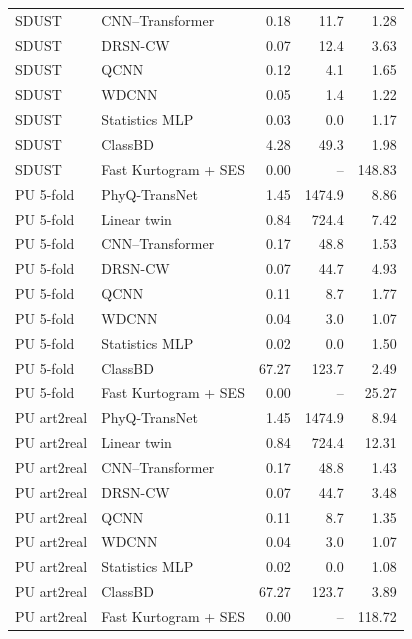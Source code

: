 \begin{tabular}{llrrr}
SDUST & CNN--Transformer & 0.18 & 11.7 & 1.28 \\
SDUST & DRSN-CW & 0.07 & 12.4 & 3.63 \\
SDUST & QCNN & 0.12 & 4.1 & 1.65 \\
SDUST & WDCNN & 0.05 & 1.4 & 1.22 \\
SDUST & Statistics MLP & 0.03 & 0.0 & 1.17 \\
SDUST & ClassBD & 4.28 & 49.3 & 1.98 \\
SDUST & Fast Kurtogram + SES & 0.00 & -- & 148.83 \\
PU 5-fold & PhyQ-TransNet & 1.45 & 1474.9 & 8.86 \\
PU 5-fold & Linear twin & 0.84 & 724.4 & 7.42 \\
PU 5-fold & CNN--Transformer & 0.17 & 48.8 & 1.53 \\
PU 5-fold & DRSN-CW & 0.07 & 44.7 & 4.93 \\
PU 5-fold & QCNN & 0.11 & 8.7 & 1.77 \\
PU 5-fold & WDCNN & 0.04 & 3.0 & 1.07 \\
PU 5-fold & Statistics MLP & 0.02 & 0.0 & 1.50 \\
PU 5-fold & ClassBD & 67.27 & 123.7 & 2.49 \\
PU 5-fold & Fast Kurtogram + SES & 0.00 & -- & 25.27 \\
PU art2real & PhyQ-TransNet & 1.45 & 1474.9 & 8.94 \\
PU art2real & Linear twin & 0.84 & 724.4 & 12.31 \\
PU art2real & CNN--Transformer & 0.17 & 48.8 & 1.43 \\
PU art2real & DRSN-CW & 0.07 & 44.7 & 3.48 \\
PU art2real & QCNN & 0.11 & 8.7 & 1.35 \\
PU art2real & WDCNN & 0.04 & 3.0 & 1.07 \\
PU art2real & Statistics MLP & 0.02 & 0.0 & 1.08 \\
PU art2real & ClassBD & 67.27 & 123.7 & 3.89 \\
PU art2real & Fast Kurtogram + SES & 0.00 & -- & 118.72 \\
\bottomrule
\end{tabular}